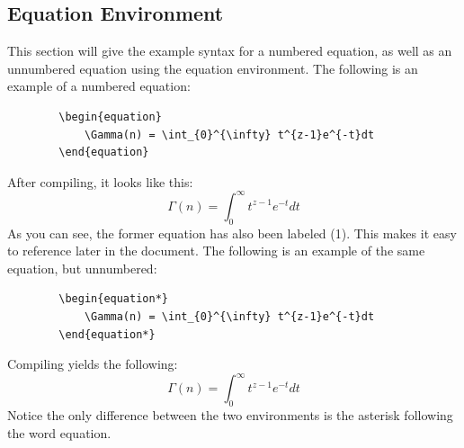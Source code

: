 \documentclass[]{article}
\begin{document}
    \subsection{Equation Environment}
    This section will give the example syntax for a numbered equation, as well as an unnumbered equation using the equation environment. The following is an example of a numbered equation:
    \begin{verbatim}
        \begin{equation}
            \Gamma(n) = \int_{0}^{\infty} t^{z-1}e^{-t}dt
        \end{equation}
    \end{verbatim}
    After compiling, it looks like this:
    \begin{equation}
        \Gamma(n) = \int_{0}^{\infty} t^{z-1}e^{-t}dt
    \end{equation}
    As you can see, the former equation has also been labeled (1). This makes it easy to reference later in the document. The following is an example of the same equation, but unnumbered:
    \begin{verbatim}
        \begin{equation*}
            \Gamma(n) = \int_{0}^{\infty} t^{z-1}e^{-t}dt
        \end{equation*}
    \end{verbatim}
    Compiling yields the following:
    \begin{equation*}
        \Gamma(n) = \int_{0}^{\infty} t^{z-1}e^{-t}dt
    \end{equation*}
    Notice the only difference between the two environments is the asterisk following the word equation.
\end{document}
